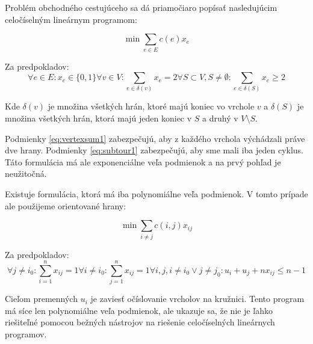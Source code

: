 Problém obchodného cestujúceho sa dá priamočiaro popísať nasledujúcim celočíselným lineárnym
programom:

$$\min \sum_{e \in E} c(e) x_e$$ 

Za predpokladov:
\begin{subequations}
\begin{equation}\forall e \in E: x_e \in \{0, 1\} \label{eq:enum}\end{equation}
\begin{equation}\forall v \in V: \sum_{e \in \delta(v)} x_e = 2 \label{eq:vertexsum1} \end{equation}
\begin{equation}\forall S \subset V, S \neq \emptyset: \sum_{e \in \delta(S)} x_e \geq 2 \label{eq:subtour1}\end{equation}
\end{subequations}

Kde $\delta(v)$ je množina všetkých hrán, ktoré majú koniec vo vrchole $v$ a
$\delta(S)$ je množina všetkých hrán, ktorá majú jeden koniec v $S$ a druhý v $V \setminus S$.

Podmienky \eqref{eq:vertexsum1} zabezpečujú, aby z každého vrchola výchádzali práve
dve hrany. Podmienky \eqref{eq:subtour1} zabezpečujú, aby sme mali iba jeden cyklus.
Táto formulácia má ale exponenciálne veľa podmienok a na prvý pohľad je neužitočná.

Existuje formulácia, ktorá má iba polynomiálne veľa podmienok. V tomto prípade
ale použijeme orientované hrany:

$$\min \sum_{i\neq j} c(i,j) x_{ij}$$

Za predpokladov:
\begin{subequations}
\begin{equation}\forall j \neq i_0: \sum_{i=1}^n x_{ij} = 1\end{equation}
\begin{equation}\forall i \neq i_0: \sum_{j=1}^n x_{ij} = 1\end{equation}
\begin{equation}\forall i,j, i \neq i_0 \vee j \neq j_0: u_i + u_j + nx_{ij} \leq n-1\end{equation}
\end{subequations}

Cieľom premenných $u_i$ je zaviesť očíslovanie vrcholov na kružnici. Tento program
má síce len polynomiálne veľa podmienok, ale ukazuje sa, že nie je ľahko riešiteľné
pomocou bežných nástrojov na riešenie celočíselných lineárnych programov.

